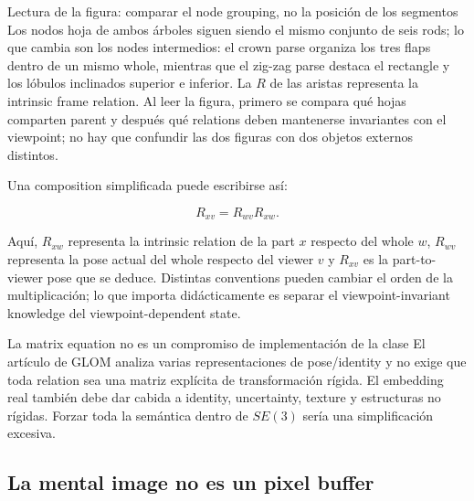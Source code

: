 

\begin{knowledgebox}{Lectura de la figura: comparar el node grouping, no la posición de los segmentos}
Los nodos hoja de ambos árboles siguen siendo el mismo conjunto de seis rods; lo que cambia son los nodes intermedios: el crown parse organiza los tres flaps dentro de un mismo whole, mientras que el zig-zag parse destaca el rectangle y los lóbulos inclinados superior e inferior. La $R$ de las aristas representa la intrinsic frame relation. Al leer la figura, primero se compara qué hojas comparten parent y después qué relations deben mantenerse invariantes con el viewpoint; no hay que confundir las dos figuras con dos objetos externos distintos.
\end{knowledgebox}

Una composition simplificada puede escribirse así:

\[
R_{xv}=R_{wv}R_{xw}.
\]

Aquí, $R_{xw}$ representa la intrinsic relation de la part $x$ respecto del whole $w$, $R_{wv}$ representa la pose actual del whole respecto del viewer $v$ y $R_{xv}$ es la part-to-viewer pose que se deduce. Distintas conventions pueden cambiar el orden de la multiplicación; lo que importa didácticamente es separar el viewpoint-invariant knowledge del viewpoint-dependent state.

\begin{warningbox}{La matrix equation no es un compromiso de implementación de la clase}
El artículo de GLOM analiza varias representaciones de pose/identity y no exige que toda relation sea una matriz explícita de transformación rígida. El embedding real también debe dar cabida a identity, uncertainty, texture y estructuras no rígidas. Forzar toda la semántica dentro de $SE(3)$ sería una simplificación excesiva.
\end{warningbox}

\subsection{La mental image no es un pixel buffer}

